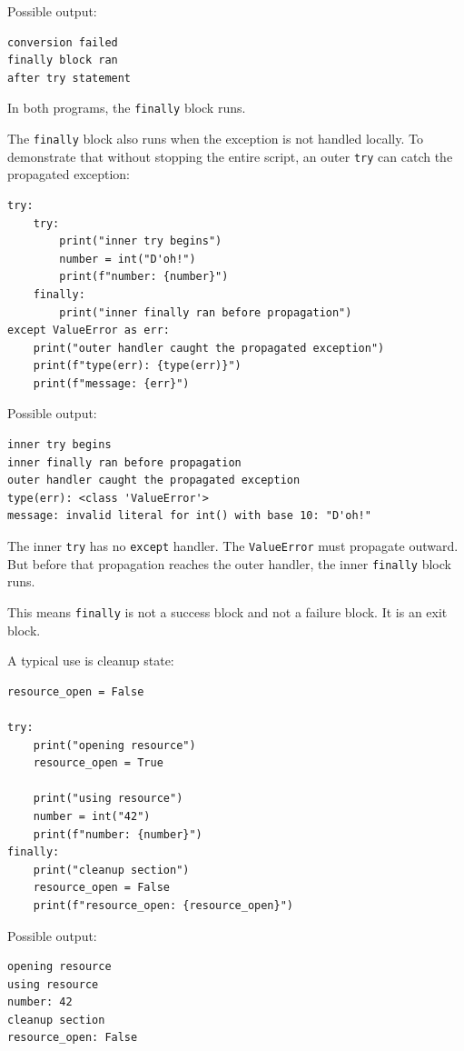 Possible output:

\begin{verbatim}
conversion failed
finally block ran
after try statement
\end{verbatim}

In both programs, the \texttt{finally} block runs.

The \texttt{finally} block also runs when the exception is not handled locally. To demonstrate that without stopping the entire script, an outer \texttt{try} can catch the propagated exception:

\begin{verbatim}
try:
    try:
        print("inner try begins")
        number = int("D'oh!")
        print(f"number: {number}")
    finally:
        print("inner finally ran before propagation")
except ValueError as err:
    print("outer handler caught the propagated exception")
    print(f"type(err): {type(err)}")
    print(f"message: {err}")
\end{verbatim}

Possible output:

\begin{verbatim}
inner try begins
inner finally ran before propagation
outer handler caught the propagated exception
type(err): <class 'ValueError'>
message: invalid literal for int() with base 10: "D'oh!"
\end{verbatim}

The inner \texttt{try} has no \texttt{except} handler. The \texttt{ValueError} must propagate outward. But before that propagation reaches the outer handler, the inner \texttt{finally} block runs.

This means \texttt{finally} is not a success block and not a failure block. It is an exit block.

A typical use is cleanup state:

\begin{verbatim}
resource_open = False

try:
    print("opening resource")
    resource_open = True

    print("using resource")
    number = int("42")
    print(f"number: {number}")
finally:
    print("cleanup section")
    resource_open = False
    print(f"resource_open: {resource_open}")
\end{verbatim}

Possible output:

\begin{verbatim}
opening resource
using resource
number: 42
cleanup section
resource_open: False
\end{verbatim}

